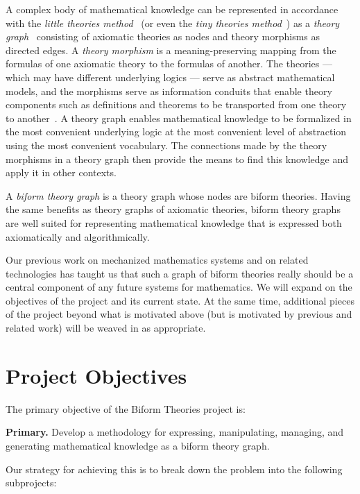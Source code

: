 \documentclass[fleqn]{llncs}
\begin{document}
A complex body of mathematical knowledge can be represented in
accordance with the \emph{little theories method}~\cite{FarmerEtAl92b}
(or even the \emph{tiny theories method}~\cite{CaretteOConnorTPC})
as a \emph{theory graph}~\cite{Kohlhase14} consisting of axiomatic
theories as nodes and theory morphisms as directed edges.  A
\emph{theory morphism} is a meaning-preserving mapping from the
formulas of one axiomatic theory to the formulas of another.  The
theories --- which may have different underlying logics --- serve as
abstract mathematical models, and the morphisms serve as information
conduits that enable theory components such as definitions and
theorems to be transported from one theory to
another~\cite{BarwiseSeligman97}.  A theory graph enables mathematical
knowledge to be formalized in the most convenient underlying logic at
the most convenient level of abstraction using the most convenient
vocabulary.  The connections made by the theory morphisms in a theory
graph then provide the means to find this knowledge and apply it in
other contexts.

A \emph{biform theory graph} is a theory graph whose nodes are biform
theories. Having the same benefits as theory graphs of axiomatic
theories, biform theory graphs are well suited for representing
mathematical knowledge that is expressed both axiomatically and
algorithmically.
  
Our previous work on mechanized mathematics systems and on related
technologies has taught us that such a graph of biform theories 
really should be a central component of any future systems for
mathematics. We will expand on the objectives of the project and
its current state. At the same time, additional pieces of the project
beyond what is motivated above (but is motivated by previous and
related work) will be weaved in as appropriate.

\section{Project Objectives}

The primary objective of the Biform Theories project is:

\bi

  \item[] \textbf{Primary.} Develop a methodology for expressing,
    manipulating, managing, and generating mathematical knowledge 
    as a biform theory graph.

\ei

\noindent
Our strategy for achieving this is to break down the problem
into the following subprojects:
\end{document}
